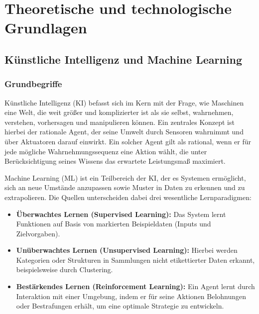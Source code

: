 \chapter{Theoretische und technologische Grundlagen}

\section{Künstliche Intelligenz und Machine Learning}

\subsection{Grundbegriffe}

Künstliche Intelligenz (\ac{KI}) befasst sich im Kern mit der Frage, wie Maschinen eine Welt, die weit größer und komplizierter ist als sie selbst, wahrnehmen, verstehen, vorhersagen und manipulieren können. Ein zentrales Konzept ist hierbei der rationale Agent, der seine Umwelt durch Sensoren wahrnimmt und über Aktuatoren darauf einwirkt. Ein solcher Agent gilt als rational, wenn er für jede mögliche Wahrnehmungssequenz eine Aktion wählt, die unter Berücksichtigung seines Wissens das erwartete Leistungsmaß maximiert.

Machine Learning (\ac{ML}) ist ein Teilbereich der \ac{KI}, der es Systemen ermöglicht, sich an neue Umstände anzupassen sowie Muster in Daten zu erkennen und zu extrapolieren. Die Quellen unterscheiden dabei drei wesentliche Lernparadigmen:

\begin{itemize}
    \item \textbf{Überwachtes Lernen (Supervised Learning):} Das System lernt Funktionen auf Basis von markierten Beispieldaten (Inputs und Zielvorgaben).
    \item \textbf{Unüberwachtes Lernen (Unsupervised Learning):} Hierbei werden Kategorien oder Strukturen in Sammlungen nicht etikettierter Daten erkannt, beispielsweise durch Clustering.
    \item \textbf{Bestärkendes Lernen (Reinforcement Learning):} Ein Agent lernt durch Interaktion mit einer Umgebung, indem er für seine Aktionen Belohnungen oder Bestrafungen erhält, um eine optimale Strategie zu entwickeln.
\end{itemize}

